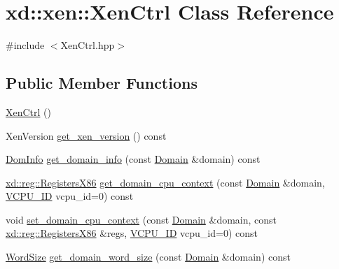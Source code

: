 \hypertarget{classxd_1_1xen_1_1_xen_ctrl}{}\section{xd\+:\+:xen\+:\+:Xen\+Ctrl Class Reference}
\label{classxd_1_1xen_1_1_xen_ctrl}


{\ttfamily \#include $<$Xen\+Ctrl.\+hpp$>$}

\subsection*{Public Member Functions}
\begin{DoxyCompactItemize}
\item 
\mbox{\hyperlink{classxd_1_1xen_1_1_xen_ctrl_a53b6326e432b0b19bad0e06d408135f7}{Xen\+Ctrl}} ()
\item 
Xen\+Version \mbox{\hyperlink{classxd_1_1xen_1_1_xen_ctrl_a7295e9559d14173e54de41a642278fae}{get\+\_\+xen\+\_\+version}} () const
\item 
\mbox{\hyperlink{namespacexd_1_1xen_a60588fc8910b3e8b14ac3d51e5de41ba}{Dom\+Info}} \mbox{\hyperlink{classxd_1_1xen_1_1_xen_ctrl_a3e2907125aeb0f8ab867a6bf9f97046b}{get\+\_\+domain\+\_\+info}} (const \mbox{\hyperlink{classxd_1_1xen_1_1_domain}{Domain}} \&domain) const
\item 
\mbox{\hyperlink{namespacexd_1_1reg_a0c10a4d10e689bc16f6f1a8feb4fb9b8}{xd\+::reg\+::\+Registers\+X86}} \mbox{\hyperlink{classxd_1_1xen_1_1_xen_ctrl_adc47e85897cf94ffef388bd5b22e71ba}{get\+\_\+domain\+\_\+cpu\+\_\+context}} (const \mbox{\hyperlink{classxd_1_1xen_1_1_domain}{Domain}} \&domain, \mbox{\hyperlink{namespacexd_1_1xen_ac71045dda8a7d9d6fd0d7643001bb14e}{V\+C\+P\+U\+\_\+\+ID}} vcpu\+\_\+id=0) const
\item 
void \mbox{\hyperlink{classxd_1_1xen_1_1_xen_ctrl_ab4aeb6cfcdb25349253700d0b1759a04}{set\+\_\+domain\+\_\+cpu\+\_\+context}} (const \mbox{\hyperlink{classxd_1_1xen_1_1_domain}{Domain}} \&domain, const \mbox{\hyperlink{namespacexd_1_1reg_a0c10a4d10e689bc16f6f1a8feb4fb9b8}{xd\+::reg\+::\+Registers\+X86}} \&regs, \mbox{\hyperlink{namespacexd_1_1xen_ac71045dda8a7d9d6fd0d7643001bb14e}{V\+C\+P\+U\+\_\+\+ID}} vcpu\+\_\+id=0) const
\item 
\mbox{\hyperlink{namespacexd_1_1xen_ab0ad6c1b122ad0b67c749ee5bae3cc1c}{Word\+Size}} \mbox{\hyperlink{classxd_1_1xen_1_1_xen_ctrl_a6623532ffdaea9fbd55f6f521bab2545}{get\+\_\+domain\+\_\+word\+\_\+size}} (const \mbox{\hyperlink{classxd_1_1xen_1_1_domain}{Domain}} \&domain) const

\end{DoxyCompactItemize}
